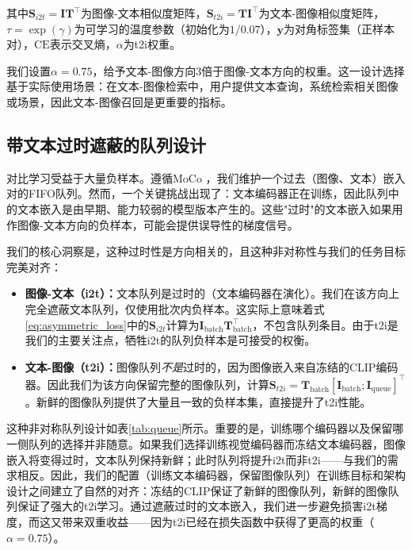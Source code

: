 \documentclass[10pt,a4paper]{ctexart}
\begin{document}
其中$\mathbf{S}_{i2t} = \mathbf{I} \mathbf{T}^{\top}$为图像-文本相似度矩阵，$\mathbf{S}_{t2i} = \mathbf{T} \mathbf{I}^{\top}$为文本-图像相似度矩阵，$\tau = \exp(\gamma)$为可学习的温度参数（初始化为$1/0.07$），$\mathbf{y}$为对角标签集（正样本对），$\text{CE}$表示交叉熵，$\alpha$为t2i权重。

我们设置$\alpha = 0.75$，给予文本-图像方向3倍于图像-文本方向的权重。这一设计选择基于实际使用场景：在文本-图像检索中，用户提供文本查询，系统检索相关图像或场景，因此文本-图像召回是更重要的指标。

\subsection{带文本过时遮蔽的队列设计}

对比学习受益于大量负样本。遵循MoCo \citep{he2020moco}，我们维护一个过去（图像、文本）嵌入对的FIFO队列。然而，一个关键挑战出现了：文本编码器正在训练，因此队列中的文本嵌入是由早期、能力较弱的模型版本产生的。这些"过时"的文本嵌入如果用作图像-文本方向的负样本，可能会提供误导性的梯度信号。

我们的核心洞察是，这种过时性是方向相关的，且这种非对称性与我们的任务目标完美对齐：

\begin{itemize}
  \item \textbf{图像-文本（i2t）：}文本队列是过时的（文本编码器在演化）。我们在该方向上完全遮蔽文本队列，仅使用批次内负样本。这实际上意味着式\ref{eq:asymmetric_loss}中的$\mathbf{S}_{i2t}$计算为$\mathbf{I}_{\text{batch}} \mathbf{T}_{\text{batch}}^{\top}$，不包含队列条目。由于t2i是我们的主要关注点，牺牲i2t的队列负样本是可接受的权衡。
  \item \textbf{文本-图像（t2i）：}图像队列\emph{不是}过时的，因为图像嵌入来自冻结的CLIP编码器。因此我们为该方向保留完整的图像队列，计算$\mathbf{S}_{t2i} = \mathbf{T}_{\text{batch}} [\mathbf{I}_{\text{batch}}; \mathbf{I}_{\text{queue}}]^{\top}$。新鲜的图像队列提供了大量且一致的负样本集，直接提升了t2i性能。
\end{itemize}

这种非对称队列设计如表\ref{tab:queue}所示。重要的是，训练哪个编码器以及保留哪一侧队列的选择并非随意。如果我们选择训练视觉编码器而冻结文本编码器，图像嵌入将变得过时，文本队列保持新鲜；此时队列将提升i2t而非t2i——与我们的需求相反。因此，我们的配置（训练文本编码器，保留图像队列）在训练目标和架构设计之间建立了自然的对齐：冻结的CLIP保证了新鲜的图像队列，新鲜的图像队列保证了强大的t2i学习。通过遮蔽过时的文本嵌入，我们进一步避免损害i2t梯度，而这又带来双重收益——因为t2i已经在损失函数中获得了更高的权重（$\alpha = 0.75$）。
\end{document}

